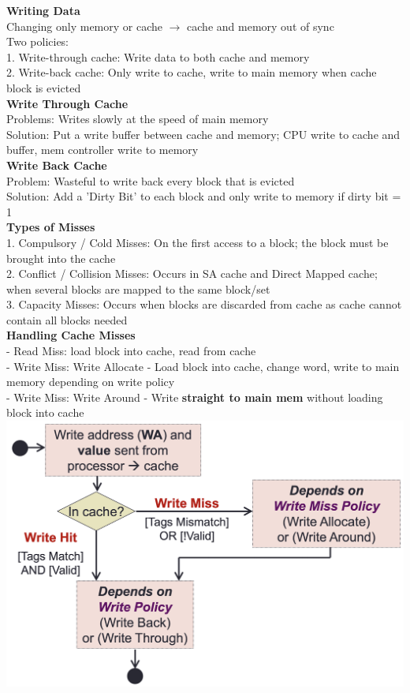 \documentclass[10pt, a4paper]{article}
\newcommand{\highlight}[1]{{\color{red}\textbf{#1}}}
\newcommand{\blue}[1]{{\color{MidnightBlue}#1}}
\newcommand{\red}[1]{{\color{red}#1}}
\newcommand{\green}[1]{{\color{ForestGreen}#1}}
\begin{document}
\begin{multicols*}{3}
		\textbf{Writing Data}\\
		Changing only memory or cache $\rightarrow$ cache and memory out of sync\\
		Two policies:\\
		1. Write-through cache: Write data to both cache and memory\\
		2. Write-back cache: Only write to cache, write to main memory when cache block is evicted\\

		\textbf{Write Through Cache}\\
		\red{Problems}: Writes slowly at the speed of main memory\\
		\green{Solution}: Put a write buffer between cache and memory; CPU write to cache and buffer, mem controller write to memory\\

		\textbf{Write Back Cache}\\
		\red{Problem}: Wasteful to write back every block that is evicted\\
		\green{Solution}: Add a 'Dirty Bit' to each block and only write to memory if dirty bit = 1\\

		\textbf{Types of Misses}\\
		1. \blue{Compulsory / Cold Misses}: On the first access to a block; the block must be brought into the cache\\
		2. \blue{Conflict / Collision Misses}: Occurs in SA cache and Direct Mapped cache; when several blocks are mapped to the same block/set\\
		3. \blue{Capacity Misses}: Occurs when blocks are discarded from cache as cache cannot contain all blocks needed\\

		\textbf{Handling Cache Misses}\\
		- \blue{Read Miss}: load block into cache, read from cache\\
		- \blue{Write Miss}: Write Allocate - Load block into cache, change word, write to main memory depending on write policy\\
		- \blue{Write Miss}: Write Around - Write \highlight{straight to main mem} without loading block into cache\\
		\includegraphics[scale=.28]{./assets/writeDataCache}


\end{multicols*}
\end{document}
